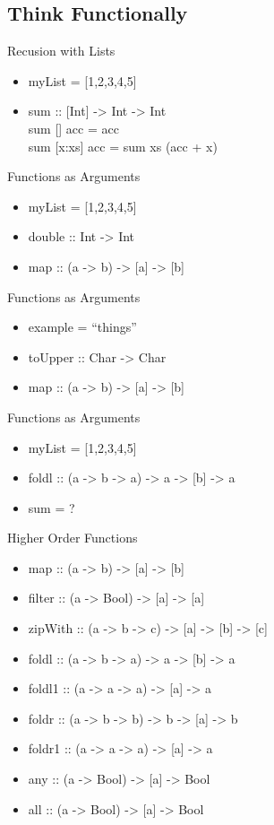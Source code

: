 \documentclass{beamer}                  %
\newcommand{\srule}{
	\rule{\textwidth}{1pt}\\
}
\newlength{\subsecwidth}
\newenvironment{slide}{
	\begin{frame} %
	\settowidth{\subsecwidth}{\insertsubsection} %
	\ifthenelse{\dimtest{\subsecwidth}{<}{1pt}}{ %
		\frametitle{\insertsection\\             %
		\vspace{-1ex}                            %
		\color{fore}\srule                       %
		\par                                     %
		\vspace{-3ex}                            %
		}
	}{                                           %
		\frametitle{\insertsection\ -- \insertsubsection\\ %
		\vspace{-1ex}                            %
		\color{fore}\srule                       %
		\par                                     %
		\vspace{-3ex}                            %
		}
	}
	\Large                                       %
}{
	\end{frame}
}
\begin{document}
\subsection{Think Functionally}
\begin{slide}
  Recusion with Lists
  \begin{itemize}
    \item myList = [1,2,3,4,5]
    \item sum :: [Int] -> Int -> Int\\
          sum [] acc     = acc\\
          sum [x:xs] acc = sum xs (acc + x)
  \end{itemize}
\end{slide}

\begin{slide}
  Functions as Arguments
  \begin{itemize}
    \item myList = [1,2,3,4,5]
    \item double :: Int -> Int
    \item map :: (a -> b) -> [a] -> [b]
  \end{itemize}
\end{slide}

\begin{slide}
  Functions as Arguments
  \begin{itemize}
    \item example = ``things''
    \item toUpper :: Char -> Char
    \item map :: (a -> b) -> [a] -> [b]
  \end{itemize}
\end{slide}

\begin{slide}
  Functions as Arguments
  \begin{itemize}
    \item myList = [1,2,3,4,5]
    \item foldl :: (a -> b -> a) -> a -> [b] -> a
    \item sum = ?
  \end{itemize}
\end{slide}

\begin{slide}
  Higher Order Functions
  \begin{itemize}
    \item map :: (a -> b) -> [a] -> [b]
    \item filter :: (a -> Bool) -> [a] -> [a]
    \item zipWith :: (a -> b -> c) -> [a] -> [b] -> [c]
    \item foldl :: (a -> b -> a) -> a -> [b] -> a
    \item foldl1 :: (a -> a -> a) -> [a] -> a
    \item foldr :: (a -> b -> b) -> b -> [a] -> b
    \item foldr1 :: (a -> a -> a) -> [a] -> a
    \item any :: (a -> Bool) -> [a] -> Bool
    \item all :: (a -> Bool) -> [a] -> Bool
  \end{itemize}
\end{slide}
\end{document}
